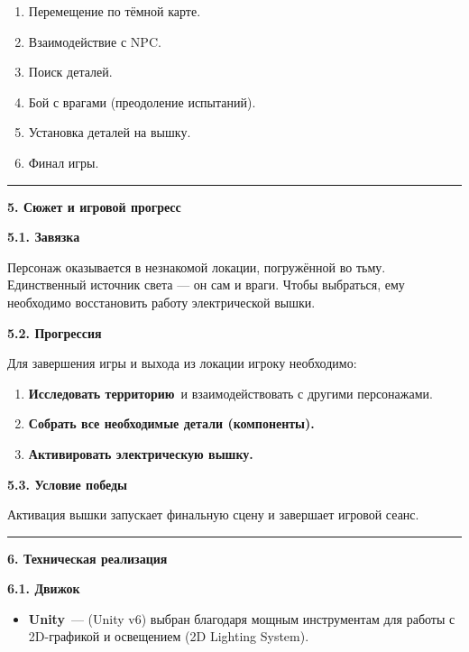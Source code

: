 \documentclass[
]{article}
\begin{document}
\begin{enumerate}
\def\labelenumi{\arabic{enumi}.}
\item
  Перемещение по тёмной карте.
\item
  Взаимодействие с NPC.
\item
  Поиск деталей.
\item
  Бой с врагами (преодоление испытаний).
\item
  Установка деталей на вышку.
\item
  Финал игры.
\end{enumerate}

\begin{center}\rule{0.5\linewidth}{0.5pt}\end{center}

\textbf{5. Сюжет и игровой прогресс}

\textbf{5.1. Завязка}

Персонаж оказывается в незнакомой локации, погружённой во тьму.
Единственный источник света --- он сам и враги. Чтобы выбраться, ему
необходимо восстановить работу электрической вышки.

\textbf{5.2. Прогрессия}

Для завершения игры и выхода из локации игроку необходимо:

\begin{enumerate}
\def\labelenumi{\arabic{enumi}.}
\item
  \textbf{Исследовать территорию}~и взаимодействовать с другими
  персонажами.
\item
  \textbf{Собрать все необходимые детали (компоненты).}
\item
  \textbf{Активировать электрическую вышку.}
\end{enumerate}

\textbf{5.3. Условие победы}

Активация вышки запускает финальную сцену и завершает игровой сеанс.

\begin{center}\rule{0.5\linewidth}{0.5pt}\end{center}

\textbf{6. Техническая реализация}

\textbf{6.1. Движок}

\begin{itemize}
\item
  \textbf{Unity}~--- (Unity v6) выбран благодаря мощным инструментам для
  работы с 2D-графикой и освещением (2D Lighting System).
\end{itemize}
\end{document}
